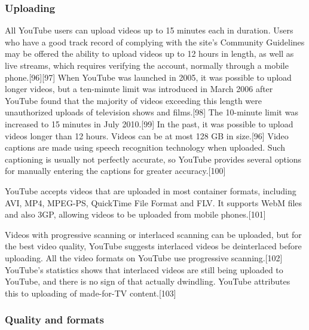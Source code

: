 \documentclass[12pt]{article}
\begin{document}
\subsubsection{Uploading}

All YouTube users can upload videos up to 15 minutes each in duration. Users who have a good track record of complying with the site's Community Guidelines may be offered the ability to upload videos up to 12 hours in length, as well as live streams, which requires verifying the account, normally through a mobile phone.[96][97] When YouTube was launched in 2005, it was possible to upload longer videos, but a ten-minute limit was introduced in March 2006 after YouTube found that the majority of videos exceeding this length were unauthorized uploads of television shows and films.[98] The 10-minute limit was increased to 15 minutes in July 2010.[99] In the past, it was possible to upload videos longer than 12 hours. Videos can be at most 128 GB in size.[96] Video captions are made using speech recognition technology when uploaded. Such captioning is usually not perfectly accurate, so YouTube provides several options for manually entering the captions for greater accuracy.[100]

YouTube accepts videos that are uploaded in most container formats, including AVI, MP4, MPEG-PS, QuickTime File Format and FLV. It supports WebM files and also 3GP, allowing videos to be uploaded from mobile phones.[101]

Videos with progressive scanning or interlaced scanning can be uploaded, but for the best video quality, YouTube suggests interlaced videos be deinterlaced before uploading. All the video formats on YouTube use progressive scanning.[102] YouTube's statistics shows that interlaced videos are still being uploaded to YouTube, and there is no sign of that actually dwindling. YouTube attributes this to uploading of made-for-TV content.[103] 

\subsubsection{Quality and formats}
\end{document}
